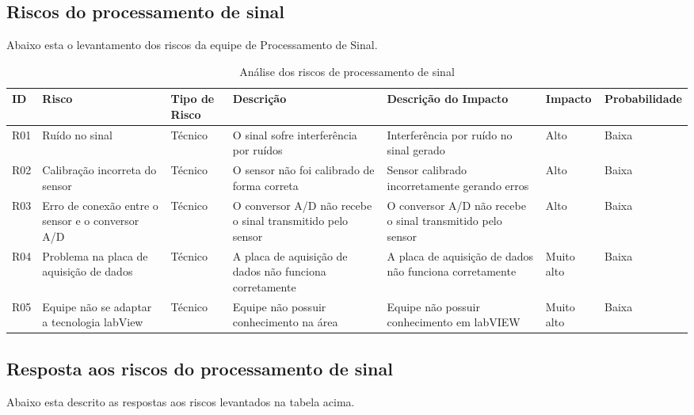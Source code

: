 \newpage\subsection{Riscos do processamento de sinal}
Abaixo esta o levantamento dos riscos da equipe de Processamento de Sinal.

\begin{table}[!htp]
    \centering
    \begin{tabular}{|p{1cm}|p{2cm}|p{2cm}|p{3cm}|p{2cm}|p{1.7cm}|p{2.9cm}|}
    \hline
    \textbf{ID}  & \textbf{Risco} & \textbf{Tipo de Risco} & \textbf{Descrição} & \textbf{Descrição do Impacto} & \textbf{Impacto} & \textbf{Probabilidade} \\ \hline
    R01 & Ruído no sinal & Técnico & O sinal sofre interferência por ruídos & Interferência por ruído no sinal gerado & Alto & Baixa \\ \hline
    R02 & Calibração incorreta do sensor & Técnico & O sensor não foi calibrado de forma correta & Sensor calibrado incorretamente gerando erros & Alto & Baixa \\ \hline 
    R03 &Erro de conexão entre o sensor e o conversor A/D &Técnico &O conversor A/D não recebe o sinal  transmitido pelo sensor &O conversor A/D não recebe o sinal  transmitido pelo sensor &Alto &Baixa \\ \hline
    R04 &Problema na placa de aquisição de dados &Técnico &A placa de aquisição de dados não funciona corretamente &A placa de aquisição de dados não funciona corretamente &Muito alto &Baixa \\ \hline
    R05 &Equipe não se adaptar a tecnologia labView &Técnico &Equipe não possuir conhecimento na área &Equipe não possuir conhecimento em labVIEW &Muito alto &Baixa \\ \hline
\end{tabular}
    \caption{Análise dos riscos de processamento de sinal}
    \end{table}

\newpage\subsection{Resposta aos riscos do processamento de sinal}
Abaixo esta descrito as respostas aos riscos levantados na tabela acima.

